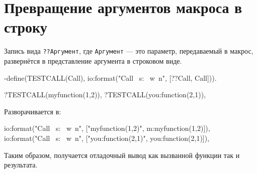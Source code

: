 \section{Превращение аргументов макроса в строку}

Запись вида \texttt{??Аргумент}, где \texttt{Аргумент} --- это параметр, передаваемый в макрос, развернётся в представление аргумента в строковом виде.

\begin{erlang}
-define(TESTCALL(Call), io:format("Call ~s: ~w~n", [??Call, Call])).

?TESTCALL(myfunction(1,2)),
?TESTCALL(you:function(2,1)),
\end{erlang}

\pagebreak
Разворачивается в:

\begin{erlang}
io:format("Call ~s: ~w~n",
          ["myfunction(1,2)", m:myfunction(1,2)]),
io:format("Call ~s: ~w~n",
          ["you:function(2,1)", you:function(2,1)]),
\end{erlang}

Таким образом, получается отладочный вывод как вызванной функции так и 
результата.
